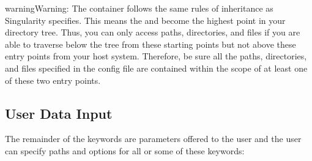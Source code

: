 \documentclass[letterpaper,10pt,english]{sphinxmanual}
\begin{document}
\begin{sphinxadmonition}{warning}{Warning:}
 The container follows the same rules of inheritance as Singularity specifies.  This means the  and  become the highest point in your directory tree.  Thus, you can only access paths, directories, and files if you are able to traverse below the tree from these starting points but not above these entry points from your host system.  Therefore, be sure all the paths, directories, and files specified in the config file are contained within the scope of at least one of these two entry points.
\end{sphinxadmonition}


\subsection{User Data Input}
\label{\detokenize{decipheringConfig:user-data-input}}
The remainder of the keywords are parameters offered to the user and the user can specify paths and options for all or some of these keywords:
\end{document}
